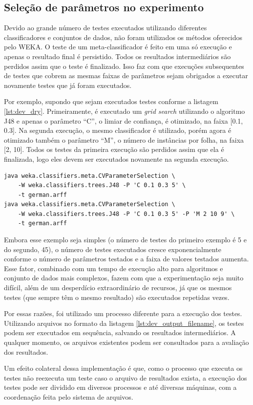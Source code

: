\subsection{Seleção de parâmetros no experimento}

Devido ao grande número de testes executados utilizando diferentes classificadores e conjuntos de dados, não foram utilizados os métodos oferecidos pelo WEKA. O teste de um meta-classificador é feito em uma só execução e apenas o resultado final é persistido. Todos os resultados intermediários são perdidos assim que o teste é finalizado. Isso faz com que execuções subsequentes de testes que cobrem as mesmas faixas de parâmetros sejam obrigados a executar novamente testes que já foram executados.

Por exemplo, supondo que sejam executados testes conforme a listagem \ref{lst:dev_dry}. Primeiramente, é executado um \emph{grid search} utilizando o algoritmo J48 e apenas o parâmetro ``C'', o limiar de confiança, é otimizado, na faixa [0.1, 0.3]. Na segunda execução, o mesmo classificador é utilizado, porém agora é otimizado também o parâmetro ``M'', o número de instâncias por folha, na faixa [2, 10]. Todos os testes da primeira execução são perdidos assim que ela é finalizada, logo eles devem ser executados novamente na segunda execução.

\vspace{0.5cm}
\begin{lstlisting}[caption=Desperdício de recursos em execuções subsequentes, label=lst:dev_dry]
java weka.classifiers.meta.CVParameterSelection \
    -W weka.classifiers.trees.J48 -P 'C 0.1 0.3 5' \
    -t german.arff
java weka.classifiers.meta.CVParameterSelection \
    -W weka.classifiers.trees.J48 -P 'C 0.1 0.3 5' -P 'M 2 10 9' \
    -t german.arff
\end{lstlisting}
\vspace{0.5cm}

Embora esse exemplo seja simples (o número de testes do primeiro exemplo é 5 e do segundo, 45), o número de testes executados cresce exponencialmente conforme o número de parâmetros testados e a faixa de valores testados aumenta. Esse fator, combinado com um tempo de execução alto para algoritmos e conjunto de dados mais complexos, fazem com que a experimentação seja muito difícil, além de um desperdício extraordinário de recursos, já que os mesmos testes (que sempre têm o mesmo resultado) são executados repetidas vezes.

Por essas razões, foi utilizado um processo diferente para a execução dos testes. Utilizando arquivos no formato da listagem \ref{lst:dev_output_filename}, os testes podem ser executados em sequência, salvando os resultados intermediários. A qualquer momento, os arquivos existentes podem ser consultados para a avaliação dos resultados.

Um efeito colateral dessa implementação é que, como o processo que executa os testes não reexecuta um teste caso o arquivo de resultados exista, a execução dos testes pode ser dividido em diversos processos e até diversas máquinas, com a coordenação feita pelo sistema de arquivos.
